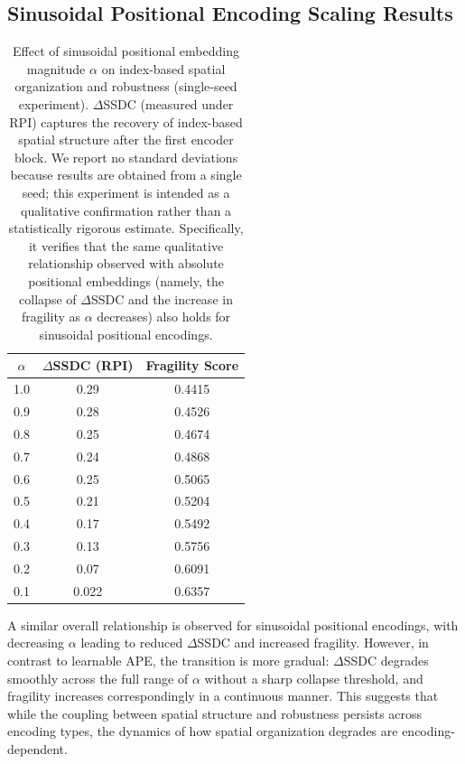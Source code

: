 \documentclass{article}
\begin{document}
  \subsection{Sinusoidal Positional Encoding Scaling Results}
    \begin{table}[H]
      \centering
      \small
      \begin{tabular}{c|c|c}
      \toprule
      \textbf{$\alpha$} & \textbf{$\Delta$SSDC (RPI)} & \textbf{Fragility Score} \\
      \midrule
      1.0 & 0.29  & 0.4415 \\
      0.9 & 0.28  & 0.4526 \\
      0.8 & 0.25  & 0.4674 \\
      0.7 & 0.24  & 0.4868 \\
      0.6 & 0.25  & 0.5065 \\
      0.5 & 0.21  & 0.5204 \\
      0.4 & 0.17  & 0.5492 \\
      0.3 & 0.13  & 0.5756 \\
      0.2 & 0.07  & 0.6091 \\
      0.1 & 0.022 & 0.6357 \\
      \bottomrule
      \end{tabular}
      \caption{
      Effect of sinusoidal positional embedding magnitude $\alpha$ on index-based spatial organization and robustness (single-seed experiment).
      $\Delta$SSDC (measured under RPI) captures the recovery of index-based spatial structure after the first encoder block.
      We report no standard deviations because results are obtained from a single seed; this experiment is intended as a qualitative confirmation rather than a statistically rigorous estimate. Specifically, it verifies that the same qualitative relationship observed with absolute positional embeddings (namely, the collapse of $\Delta$SSDC and the increase in fragility as $\alpha$ decreases) also holds for sinusoidal positional encodings.
      }
      \label{tab:sinupe_scaling_single_seed}
    \end{table}

    A similar overall relationship is observed for sinusoidal positional encodings, with decreasing $\alpha$ leading to reduced $\Delta$SSDC and increased fragility. However, in contrast to learnable APE, the transition is more gradual: $\Delta$SSDC degrades smoothly across the full range of $\alpha$ without a sharp collapse threshold, and fragility increases correspondingly in a continuous manner. This suggests that while the coupling between spatial structure and robustness persists across encoding types, the dynamics of how spatial organization degrades are encoding-dependent.
\end{document}
